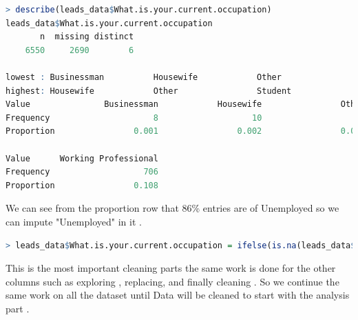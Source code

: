 \begin{lstlisting}[language=R]
> describe(leads_data$What.is.your.current.occupation)
leads_data$What.is.your.current.occupation 
       n  missing distinct 
    6550     2690        6 

lowest : Businessman          Housewife            Other                Student              Unemployed          
highest: Housewife            Other                Student              Unemployed           Working Professional
Value               Businessman            Housewife                Other              Student           Unemployed
Frequency                     8                   10                   16                  210                 5600
Proportion                0.001                0.002                0.002                0.032                0.855
                               
Value      Working Professional
Frequency                   706
Proportion                0.108
\end{lstlisting}
We can see from the proportion row that 86\% entries are of Unemployed so we can impute "Unemployed" in it .
\begin{lstlisting}[language=R]
> leads_data$What.is.your.current.occupation = ifelse(is.na(leads_data$What.is.your.current.occupation),"Unemployed",leads_data$What.is.your.current.occupation)
\end{lstlisting}
This is the most important cleaning parts the same work is done for the other columns such as exploring , replacing, and finally cleaning . So we continue the same work on all the dataset until Data will be cleaned to start with the analysis part .\\



